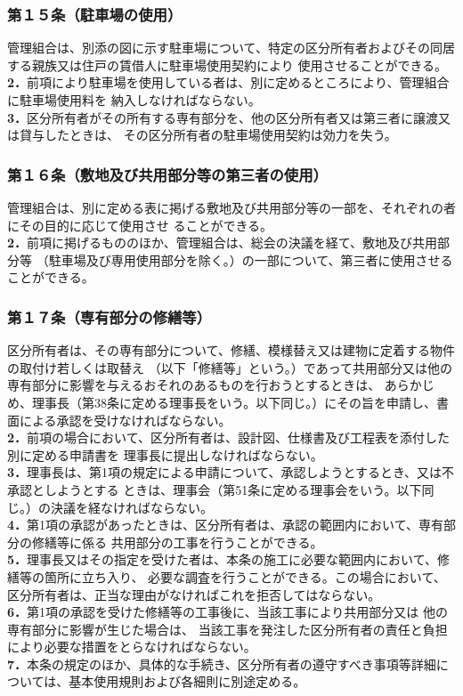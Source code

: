 \documentclass[12pt,uplatex,dvipdfmx]{jsarticle}
\begin{document}
\subsubsection*{第１５条（駐車場の使用）}
管理組合は、別添の図に示す駐車場について、特定の区分所有者およびその同居する親族又は住戸の賃借人に駐車場使用契約により
使用させることができる。\\
\textbf{2．}前項により駐車場を使用している者は、別に定めるところにより、管理組合に駐車場使用料を
納入しなければならない。\\
\textbf{3．}区分所有者がその所有する専有部分を、他の区分所有者又は第三者に譲渡又は貸与したときは、
その区分所有者の駐車場使用契約は効力を失う。
\subsubsection*{第１６条（敷地及び共用部分等の第三者の使用）}
管理組合は、別に定める表に掲げる敷地及び共用部分等の一部を、それぞれの者にその目的に応じて使用させ
ることができる。\\
\textbf{2．}前項に掲げるもののほか、管理組合は、総会の決議を経て、敷地及び共用部分等
（駐車場及び専用使用部分を除く。）の一部について、第三者に使用させることができる。
\subsubsection*{第１７条（専有部分の修繕等）}
区分所有者は、その専有部分について、修繕、模様替え又は建物に定着する物件の取付け若しくは取替え
（以下「修繕等」という。）であって共用部分又は他の専有部分に影響を与えるおそれのあるものを行おうとするときは、
あらかじめ、理事長（第38条に定める理事長をいう。以下同じ。）にその旨を申請し、書面による承認を受けなければならない。\\
\textbf{2．}前項の場合において、区分所有者は、設計図、仕様書及び工程表を添付した別に定める申請書を
理事長に提出しなければならない。\\
\textbf{3．}理事長は、第1項の規定による申請について、承認しようとするとき、又は不承認としようとする
ときは、理事会（第51条に定める理事会をいう。以下同じ。）の決議を経なければならない。\\
\textbf{4．}第1項の承認があったときは、区分所有者は、承認の範囲内において、専有部分の修繕等に係る
共用部分の工事を行うことができる。\\
\textbf{5．}理事長又はその指定を受けた者は、本条の施工に必要な範囲内において、修繕等の箇所に立ち入り、
必要な調査を行うことができる。この場合において、区分所有者は、正当な理由がなければこれを拒否してはならない。\\
\textbf{6．}第1項の承認を受けた修繕等の工事後に、当該工事により共用部分又は 他の専有部分に影響が生じた場合は、
当該工事を発注した区分所有者の責任と負担により必要な措置をとらなければならない。\\
\textbf{7．}本条の規定のほか、具体的な手続き、区分所有者の遵守すべき事項等詳細については、基本使用規則および各細則に別途定める。
\end{document}
